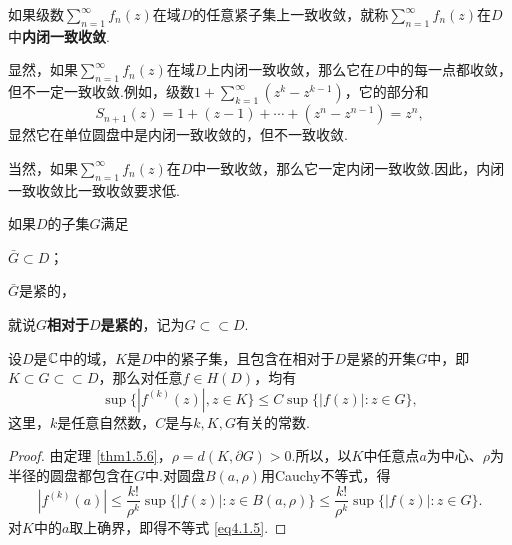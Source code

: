 \begin{definition}\label{def4.1.6}
如果级数$\sum_{n=1}^\infty f_n(z)$在域$D$的任意紧子集上一致收敛，就称$\sum_{n=1}^\infty f_n(z)$在$D$中\textbf{内闭一致收敛}.
\end{definition}

显然，如果$\sum_{n=1}^\infty f_n(z)$在域$D$上内闭一致收敛，那么它在$D$中的每一点都收敛，但不一定一致收敛.例如，级数$1+\sum_{k=1}^\infty(z^k-z^{k-1})$，它的部分和
\[S_{n+1}(z)=1+(z-1)+\cdots+(z^n-z^{n-1})=z^n,\]
显然它在单位圆盘中是内闭一致收敛的，但不一致收敛.

当然，如果$\sum_{n=1}^\infty f_n(z)$在$D$中一致收敛，那么它一定内闭一致收敛.因此，内闭一致收敛比一致收敛要求低.
\begin{definition}\label{def4.1.7}
如果$D$的子集$G$满足
\begin{eenum}
  \item $\bar G\subset D$；
  \item $\bar G$是紧的，
\end{eenum}
就说\textbf{$G$相对于$D$是紧的}，记为$G\subset\subset D$.
\end{definition}
\begin{lemma}\label{lemma4.1.8}
  设$D$是$\mathbb C$中的域，$K$是$D$中的紧子集，且包含在相对于$D$是紧的开集$G$中，即$K\subset G\subset\subset D$，那么对任意$f\in H(D)$，均有
\begin{equation}\label{eq4.1.5}\sup\{|f^{(k)}(z)|,z\in K\}\le C\sup\{|f(z)|:z\in G\},
\end{equation}
这里，$k$是任意自然数，$C$是与$k,K,G$有关的常数.
\end{lemma}
\begin{proof}
由定理 \ref{thm1.5.6}，$\rho=d(K,\partial G)>0$.所以，以$K$中任意点$a$为中心、$\rho$为半径的圆盘都包含在$G$中.对圆盘$B(a,\rho)$用Cauchy不等式，得
\[
|f^{(k)}(a)|\le\frac{k!}{\rho^k}\sup\{|f(z)|:z\in B(a,\rho)\}\le\frac{k!}{\rho^k}
\sup\{|f(z)|:z\in G\}.
\]
对$K$中的$a$取上确界，即得不等式 \eqref{eq4.1.5}.
\end{proof}

